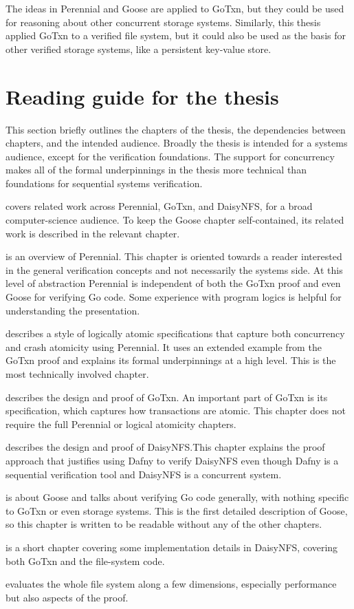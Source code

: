The ideas in Perennial and Goose are applied to GoTxn, but they could be used
for reasoning about other concurrent storage systems. Similarly,
this thesis applied GoTxn to a verified file system, but it could also be used
as the basis for other verified storage systems, like a persistent key-value
store.


\section{Reading guide for the thesis}
\label{sec:intro:reading-guide}

This section briefly outlines the chapters of the thesis, the dependencies
between chapters, and the intended audience. Broadly the thesis is intended for
a systems audience, except for the verification foundations. The support for
concurrency makes all of the formal underpinnings in the thesis more technical
than foundations for sequential systems verification.

 covers related work across Perennial, GoTxn, and DaisyNFS, for
a broad computer-science audience. To keep the Goose chapter self-contained, its
related work is described in the relevant chapter.

 is an overview of Perennial. This chapter is oriented
towards a reader interested in the general verification concepts and not
necessarily the systems side. At this level of abstraction Perennial is
independent of both the GoTxn proof and even Goose for verifying Go code. Some
experience with program logics is helpful for understanding the presentation.

 describes a style of logically atomic specifications
that capture both concurrency and crash atomicity using Perennial. It uses an
extended example from the GoTxn proof and explains its formal underpinnings at a
high level. This is the most technically involved chapter.

 describes the design and proof of GoTxn. An important part of GoTxn is its
specification, which captures how transactions are atomic. This chapter does not
require the full Perennial or logical atomicity chapters.

 describes the design and proof of DaisyNFS.\@ This chapter
explains the proof approach that justifies using Dafny to verify DaisyNFS even
though Dafny is a sequential verification tool and DaisyNFS is a concurrent
system.

 is about Goose and talks about verifying Go code generally, with
nothing specific to GoTxn or even storage systems. This is the first detailed
description of Goose, so this chapter is written to be readable without any of
the other chapters.

 is a short chapter covering some implementation details in
DaisyNFS, covering both GoTxn and the file-system code.

 evaluates the whole file system along a few dimensions,
especially performance but also aspects of the proof.
